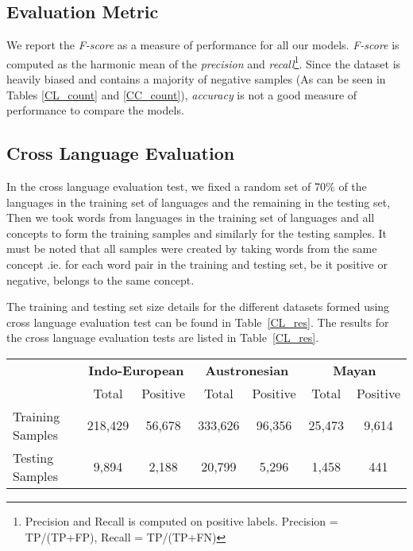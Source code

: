 \documentclass[11pt,letterpaper]{article}
\begin{document}
\subsection{Evaluation Metric}

We report the \textit{F-score} as a measure of performance for all our models. \textit{F-score} is computed as the harmonic mean of the \textit{precision} and \textit{recall}\footnote{Precision and Recall is computed on positive labels. Precision = TP/(TP+FP), Recall = TP/(TP+FN)}. Since the dataset is heavily biased and contains a majority of negative samples (As can be seen in Tables \ref{CL_count} and \ref{CC_count}), \textit{accuracy} is not a good measure of performance to compare the models.

\subsection{Cross Language Evaluation}

In the cross language evaluation test, we fixed a random set of 70\% of the languages in the training set of languages and the remaining in the testing set, Then we took words from languages in the training set of languages and all concepts to form the training samples and similarly for the testing samples. It must be noted that all samples were created by taking words from the same concept .ie. for each word pair in the training and testing set, be it positive or negative, belongs to the same concept.

The training and testing set size details for the different datasets formed using cross language evaluation test can be found in Table~\ref{CL_res}. The results for the cross language evaluation tests are listed in Table~\ref{CL_res}.

\begin{table*}[t]
\centering
\begin{tabular}{lcccccc}
\multicolumn{1}{c}{\textbf{}} & \multicolumn{2}{c}{\textbf{Indo-European}} & \multicolumn{2}{c}{\textbf{Austronesian}} & \multicolumn{2}{c}{\textbf{Mayan}} \\
\multicolumn{1}{c}{}          & Total               & Positive             & Total               & Positive            & Total           & Positive         \\
Training Samples              & 218,429             & 56,678               & 333,626             & 96,356              & 25,473          & 9,614            \\
Testing Samples               & 9,894               & 2,188                & 20,799              & 5,296               & 1,458           & 441             
\end{tabular}
\caption{Data size for Cross Language Evaluation}
\label{CL_count}
\end{table*}
\end{document}
